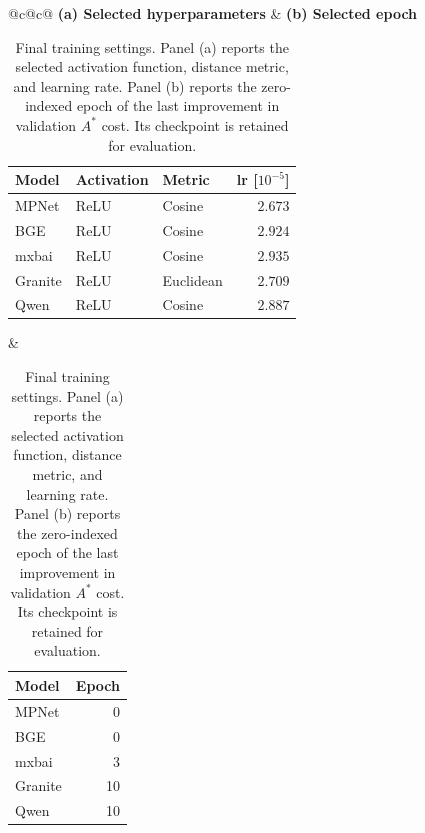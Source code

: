 \begin{table}[t]
  \centering
  \small
  \begin{tabular}{@{}c@{\hspace{7.25em}}c@{}}
    \textbf{(a) Selected hyperparameters} & \textbf{(b) Selected epoch} \\[2pt]
    \begin{tabular}[t]{@{}lllr@{}}
      \toprule
      \textbf{Model} & \textbf{Activation} & \textbf{Metric} & \textbf{lr [$10^{-5}$]} \\
      \midrule
      MPNet & ReLU & Cosine & $2.673$ \\
      BGE & ReLU & Cosine & $2.924$ \\
      mxbai & ReLU & Cosine & $2.935$ \\
      Granite & ReLU & Euclidean & $2.709$ \\
      Qwen & ReLU & Cosine & $2.887$ \\
      \bottomrule
    \end{tabular}
    &
    \begin{tabular}[t]{@{}lr@{}}
      \toprule
      \textbf{Model} & \textbf{Epoch} \\
      \midrule
      MPNet & 0 \\
      BGE & 0 \\
      mxbai & 3 \\
      Granite & 10 \\
      Qwen & 10 \\
      \bottomrule
    \end{tabular}
  \end{tabular}
  \caption{Final training settings. Panel (a) reports the selected activation function, distance metric, and learning rate. Panel (b) reports the zero-indexed epoch of the last improvement in validation $A^*$ cost. Its checkpoint is retained for evaluation.}
  \label{tab:training-hyperparameters}
\end{table}
